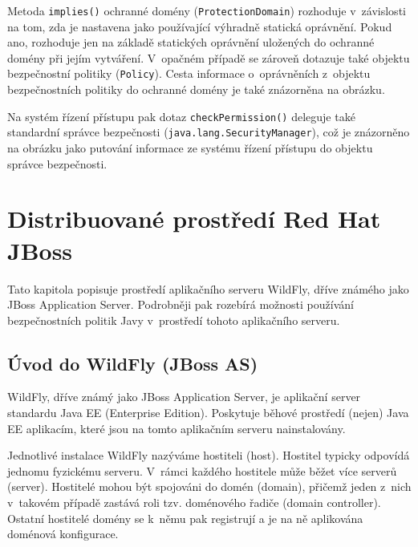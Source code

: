 Metoda {\tt implies()} ochranné domény ({\tt ProtectionDomain}) rozhoduje v~závislosti na tom, zda je nastavena jako používající výhradně statická oprávnění.
Pokud ano, rozhoduje jen na základě statických oprávnění uložených do ochranné domény při jejím vytváření.
V~opačném případě se zároveň dotazuje také objektu bezpečnostní politiky ({\tt Policy}).
Cesta informace o~oprávněních z~objektu bezpečnostních politiky do ochranné domény je také znázorněna na obrázku.

Na systém řízení přístupu pak dotaz {\tt checkPermission()} deleguje také standardní správce bezpečnosti ({\tt java.lang.SecurityManager}), což je znázorněno na obrázku jako putování informace ze systému řízení přístupu do objektu správce bezpečnosti.


\chapter{Distribuované prostředí Red Hat JBoss} \label{jboss}

Tato kapitola popisuje prostředí aplikačního serveru WildFly, dříve známého jako JBoss Application Server.
Podrobněji pak rozebírá možnosti používání bezpečnostních politik Javy v~prostředí tohoto aplikačního serveru.

\section{Úvod do WildFly (JBoss AS)} \label{uvodWildFly}

WildFly, dříve známý jako JBoss Application Server, je aplikační server standardu Java EE (Enterprise Edition).
Poskytuje běhové prostředí (nejen) Java EE aplikacím, které jsou na tomto aplikačním serveru nainstalovány.
\cite{wildflyRename}

Jednotlivé instalace WildFly nazýváme hostiteli (host). Hostitel typicky odpovídá jednomu fyzickému serveru.
V~rámci každého hostitele může běžet více serverů (server).
Hostitelé mohou být spojováni do domén (domain), přičemž jeden z~nich v~takovém případě zastává roli tzv. doménového řadiče (domain controller).
Ostatní hostitelé domény se k~němu pak registrují a je na ně aplikována doménová konfigurace.
\cite{jbossDomainSetup}

